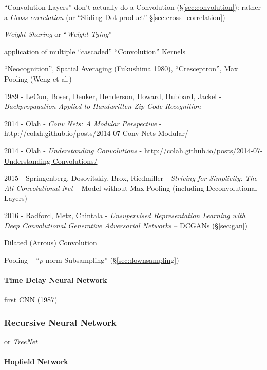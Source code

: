 ``Convolution Layers'' don't actually do a Convolution
(\S\ref{sec:convolution}):
rather a \emph{Cross-correlation} (or ``Sliding Dot-product''
\S\ref{sec:cross_correlation})

\emph{Weight Sharing} or ``\emph{Weight Tying}''

application of multiple ``cascaded'' ``Convolution'' Kernels

``Neocognition'', Spatial Averaging (Fukushima 1980), ``Cresceptron'', Max
Pooling (Weng et al.)

1989 - LeCun, Boser, Denker, Henderson, Howard, Hubbard, Jackel -
  \emph{Backpropagation Applied to Handwritten Zip Code Recognition}

2014 - Olah - \emph{Conv Nets: A Modular Perspective} -
  \url{http://colah.github.io/posts/2014-07-Conv-Nets-Modular/}

2014 - Olah - \emph{Understanding Convolutions} -
  \url{http://colah.github.io/posts/2014-07-Understanding-Convolutions/}

2015 - Springenberg, Dosovitskiy, Brox, Riedmiller -
\emph{Striving for Simplicity: The All Convolutional Net}
-- Model without Max Pooling (including Deconvolutional Layers)

2016 - Radford, Metz, Chintala - \emph{Unsupervised Representation Learning with
  Deep Convolutional Generative Adversarial Networks} -- DCGANs
(\S\ref{sec:gan})

Dilated (Atrous) Convolution

Pooling -- ``$p$-norm Subsampling'' (\S\ref{sec:downsampling})



\paragraph{Time Delay Neural Network}\label{sec:tdnn}\hfill

first CNN (1987)



\subsubsection{Recursive Neural Network}\label{sec:recursive_nn}

or \emph{TreeNet}



\paragraph{Hopfield Network}\label{sec:hopfield_network}\hfill

